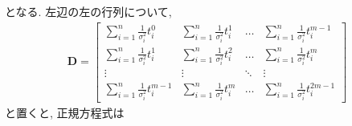 となる. 
左辺の左の行列について, 
\begin{align}
    \bm{D} =
    \begin{bmatrix}
        \sum_{i=1}^{n} \frac{1}{\sigma_{i}^{2}} t_{i}^{0} &
        \sum_{i=1}^{n} \frac{1}{\sigma_{i}^{2}} t_{i}^{1} &
        \ldots &
        \sum_{i=1}^{n} \frac{1}{\sigma_{i}^{2}} t_{i}^{m-1}
        \\
        \sum_{i=1}^{n} \frac{1}{\sigma_{i}^{2}} t_{i}^{1} &
        \sum_{i=1}^{n} \frac{1}{\sigma_{i}^{2}} t_{i}^{2} &
        \ldots &
        \sum_{i=1}^{n} \frac{1}{\sigma_{i}^{2}} t_{i}^{m}
        \\
        \vdots & \vdots & \ddots & \vdots
        \\
        \sum_{i=1}^{n} \frac{1}{\sigma_{i}^{2}} t_{i}^{m-1} &
        \sum_{i=1}^{n} \frac{1}{\sigma_{i}^{2}} t_{i}^{m}   &
        \ldots &
        \sum_{i=1}^{n} \frac{1}{\sigma_{i}^{2}} t_{i}^{2m-1}
    \end{bmatrix}
    \label{Eq:LSM-Def-Matrix-D}
\end{align}
と置くと, 正規方程式は
